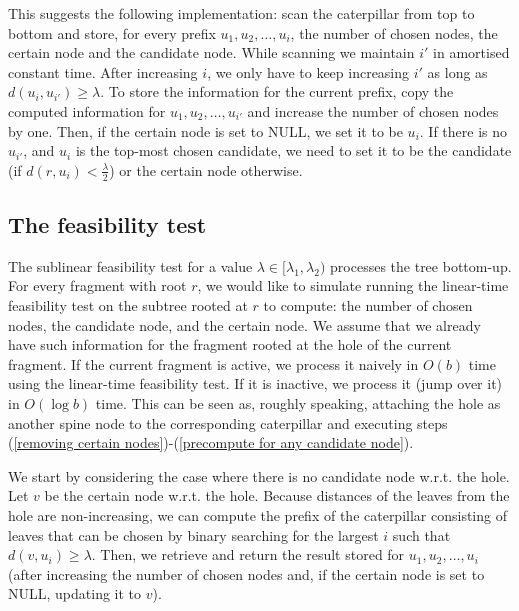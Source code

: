 \documentclass[a4paper,UKenglish]{lipics-v2016}
\newcounter{mycounter}
\newenvironment{noindlist}
 {\begin{list}{\arabic{mycounter}.~~}{\usecounter{mycounter} \labelsep=0em \labelwidth=0em \leftmargin=0em \itemindent=0em}}
 {\end{list}}
\theoremstyle{plain}
\begin{document}
\begin{noindlist}
This suggests the following implementation: scan the caterpillar from top to bottom and store, for every prefix $u_{1},u_{2},\ldots,u_{i}$,
the number of chosen nodes, the certain node and the candidate node. While scanning we maintain $i'$ in amortised constant time.
After increasing $i$, we only have to keep increasing $i'$ as long as $d(u_{i},u_{i'}) \ge \lambda$.
To store the information for the current prefix, copy the computed information for $u_{1},u_{2},\ldots,u_{i'}$
and increase the number of chosen nodes by one. Then, if the certain node is set to NULL, we set it to be $u_{i}$. If there is no $u_{i'}$, and $u_i$ is the top-most chosen candidate, we need to set it to be the candidate (if $d(r,u_i) < \frac{\lambda}{2}$) or the certain node otherwise.
\end{noindlist}

\subsection{The feasibility test}
\label{sec:feasibility test}

The sublinear feasibility test for a value $\lambda \in [\lambda_1,\lambda_2)$ processes the tree bottom-up. For every fragment with root $r$, we would like to simulate running the
linear-time feasibility test on the subtree rooted at $r$ to compute: the number of chosen nodes, the candidate node, and the certain
node. We assume that we already have such information for the fragment rooted at the hole of the current fragment.
If the current fragment is active, we process it naively in $O(b)$ time
using the linear-time feasibility test. If it is inactive, we process it (jump over it) in $O(\log b)$ time.
This can be seen as, roughly speaking, attaching the hole as another spine node to the corresponding caterpillar and executing steps
(\ref{removing certain nodes})-(\ref{precompute for any candidate node}).

We start by considering the case where there is no candidate node w.r.t. the hole. Let $v$ be the certain node w.r.t. the hole.
Because distances of the leaves from the hole are non-increasing,  we can compute the prefix of the caterpillar consisting of
leaves that can be chosen by binary searching for the largest $i$ such that $d(v,u_{i})\geq \lambda$. Then, we retrieve and return the result
stored for $u_{1},u_{2},\ldots,u_{i}$ (after increasing the number of chosen nodes and, if the certain node is set to NULL, updating it to $v$).
\end{document}
